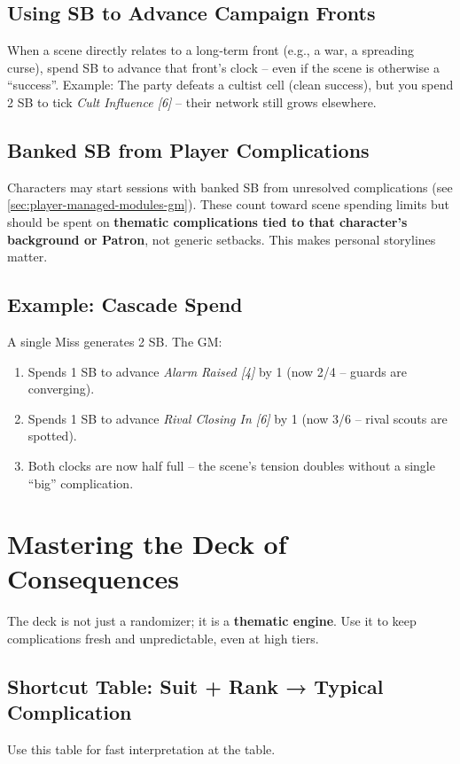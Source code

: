 \subsection*{Using SB to Advance Campaign Fronts}
When a scene directly relates to a long‑term front (e.g., a war, a spreading curse), spend SB to advance that front’s clock – even if the scene is otherwise a “success”. Example: The party defeats a cultist cell (clean success), but you spend 2 SB to tick \emph{Cult Influence [6]} – their network still grows elsewhere.

\subsection*{Banked SB from Player Complications}
Characters may start sessions with banked SB from unresolved complications (see \ref{sec:player-managed-modules-gm}). These count toward scene spending limits but should be spent on \textbf{thematic complications tied to that character’s background or Patron}, not generic setbacks. This makes personal storylines matter.

\subsection*{Example: Cascade Spend}
A single Miss generates 2 SB. The GM:
\begin{enumerate}
  \item Spends 1 SB to advance \emph{Alarm Raised [4]} by 1 (now 2/4 – guards are converging).
  \item Spends 1 SB to advance \emph{Rival Closing In [6]} by 1 (now 3/6 – rival scouts are spotted).
  \item Both clocks are now half full – the scene’s tension doubles without a single “big” complication.
\end{enumerate}

\section{Mastering the Deck of Consequences}

The deck is not just a randomizer; it is a \textbf{thematic engine}. Use it to keep complications fresh and unpredictable, even at high tiers.

\subsection*{Shortcut Table: Suit + Rank → Typical Complication}
\label{subsec:deck-shortcut}
Use this table for fast interpretation at the table.


